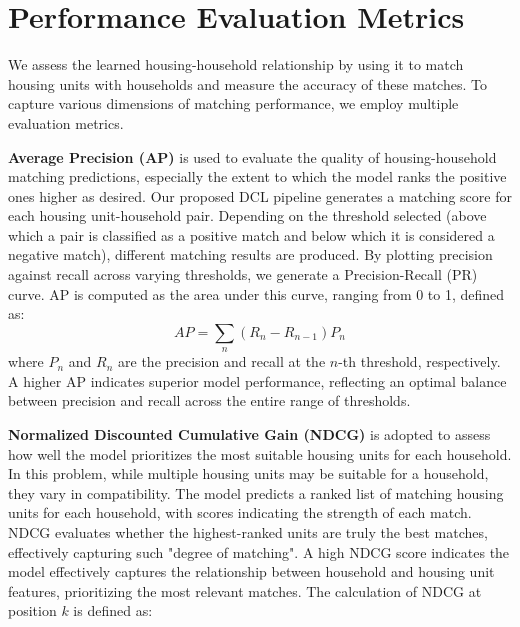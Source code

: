 \documentclass[]{nature_mod}
\begin{document}
\section{Performance Evaluation Metrics}\label{sec:performance-evaluation}


We assess the learned housing-household relationship by using it to match housing units with households and measure the accuracy of these matches. To capture various dimensions of matching performance, we employ multiple evaluation metrics. 

\textbf{Average Precision (AP)} \cite{davis2006relationship} is used to evaluate the quality of housing-household matching predictions, especially the extent to which the model ranks the positive ones higher as desired. Our proposed DCL pipeline generates a matching score for each housing unit-household pair. Depending on the threshold selected (above which a pair is classified as a positive match and below which it is considered a negative match), different matching results are produced. By plotting precision against recall across varying thresholds, we generate a Precision-Recall (PR) curve. AP is computed as the area under this curve, ranging from 0 to 1, defined as:
\begin{equation}
  AP = \sum_{n} (R_n - R_{n-1}) P_n
\end{equation}
where $P_n$ and $R_n$ are the precision and recall at the $n$-th threshold, respectively. A higher AP indicates superior model performance, reflecting an optimal balance between precision and recall across the entire range of thresholds.

\textbf{Normalized Discounted Cumulative Gain (NDCG)} \cite{jarvelin2002cumulated} is adopted to assess how well the model prioritizes the most suitable housing units for each household. In this problem, while multiple housing units may be suitable for a household, they vary in compatibility. The model predicts a ranked list of matching housing units for each household, with scores indicating the strength of each match. NDCG evaluates whether the highest-ranked units are truly the best matches, effectively capturing such "degree of matching". A high NDCG score indicates the model effectively captures the relationship between household and housing unit features, prioritizing the most relevant matches. The calculation of NDCG at position $k$ is defined as:
\end{document}
